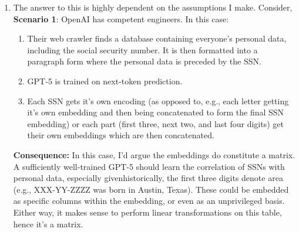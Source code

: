 \documentclass[]{exam}
\begin{document}
\begin{questions}
\begin{enumerate}[label=\arabic*.]
	\item The answer to this is highly dependent on the assumptions I make. Consider, \\
		\textbf{Scenario 1}: OpenAI has competent engineers. In this case:
		\begin{enumerate}[label=\alph*.]
			\item Their web crawler finds a database containing everyone's personal data, including the social security number. It is then formatted into a paragraph form where the personal data is preceded by the SSN.
			\item GPT-5 is trained on next-token prediction.
			\item Each SSN gets it's own encoding (as opposed to, e.g., each letter getting it's own embedding and then being concatenated to form the final SSN embedding) or each part (first three, next two, and last four digits) get their own embeddings which are then concatenated.
		\end{enumerate}
		\textbf{Consequence:} In this case, I'd argue the embeddings do constitute a matrix. A sufficiently well-trained GPT-5 should learn the correlation of SSNs with personal data, especially givenhistorically, the first three digits denote area (e.g., XXX-YY-ZZZZ was born in Austin, Texas). These could be embedded as specific columns within the embedding, or even as an unprivileged basis. Either way, it makes sense to perform linear transformations on this table, hence it's a matrix. \\


\end{enumerate}
\end{questions}
\end{document}
